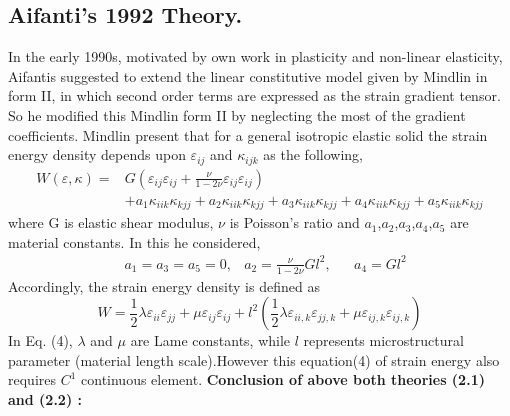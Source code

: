 \documentclass[12pt]{article}
\begin{document}
\subsection{Aifanti's 1992 Theory.} 
In the early 1990s, motivated by own work in plasticity and non-linear elasticity, Aifantis \cite{askes2011gradient} suggested to extend the linear constitutive model given by Mindlin in form II, in which second order terms are expressed as the strain gradient tensor. So he modified this Mindlin form II by neglecting the most of the gradient coefficients. Mindlin present that for a general isotropic elastic solid the strain energy density depends upon
$\varepsilon_{ij}$ and $\kappa_{ijk}$ as the following,
\begin{equation}\label{two}
\begin{aligned}
W(\varepsilon,\kappa) = 
& G(\varepsilon_{ij}\varepsilon_{ij}+\frac{\nu}{1-2\nu}\varepsilon_{ij}\varepsilon_{ij}) \\
&    +a_1\kappa_{iik}\kappa_{kjj}+a_2\kappa_{iik}\kappa_{kjj}+a_3\kappa_{iik}\kappa_{kjj}+a_4\kappa_{iik}\kappa_{kjj}+a_5\kappa_{iik}\kappa_{kjj}
\end{aligned}
\end{equation}
where G is elastic shear modulus, $\nu$ is Poisson's ratio and $a_1$,$a_2$,$a_3$,$a_4$,$a_5$ are material constants.   
\newline
In this he considered,
\newline
\begin{equation}
\begin{aligned}
& a_1 = a_3 = a_5 = 0,   &   a_2 = \frac{\nu}{1-2\nu}Gl^2, &&  a_4 = Gl^2
\end{aligned}
\end{equation} 
Accordingly, the strain energy density is defined as
\begin{equation}
W = \frac{1}{2}\lambda\varepsilon_{ii}\varepsilon_{jj}+\mu\varepsilon_{ij}\varepsilon_{ij}+l^2(\frac{1}{2}\lambda\varepsilon_{ii,k}\varepsilon_{jj,k}+\mu\varepsilon_{ij,k}\varepsilon_{ij,k})
\end{equation}
In Eq. (4), $\lambda$ and $\mu$ are Lame constants, while $l$ represents microstructural parameter (material length scale).However this equation(4) of strain energy also requires 
$C^{1}$ continuous element.
\newline
\newline
\textbf{Conclusion of above both theories (2.1) and (2.2) : }
\newline
\newline
\end{document}

